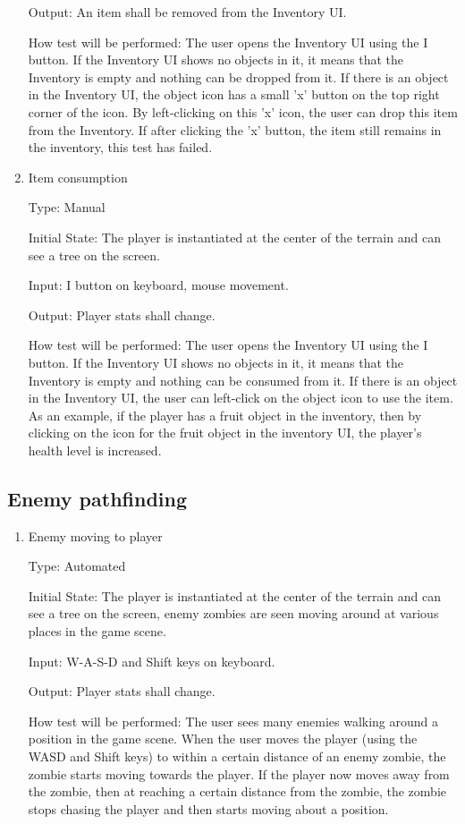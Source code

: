 \documentclass[12pt, titlepage]{article}
\begin{document}
\begin{enumerate}
Output: An item shall be removed from the Inventory UI.

How test will be performed:
The user opens the Inventory UI using the I button. If the Inventory UI shows no objects in it, it means that the Inventory is empty and nothing can be dropped from it. If there is an object in the Inventory UI, the object icon has a small 'x' button on the top right corner of the icon. By left-clicking on this 'x' icon, the user can drop this item from the Inventory. If after clicking the 'x' button, the item still remains in the inventory, this test has failed.

\item{Item consumption\\}

Type: Manual

Initial State: The player is instantiated at the center of the terrain and can see a tree on the screen.

Input: I button on keyboard, mouse movement.

Output: Player stats shall change.

How test will be performed:
The user opens the Inventory UI using the I button. If the Inventory UI shows no objects in it, it means that the Inventory is empty and nothing can be consumed from it. If there is an object in the Inventory UI, the user can left-click on the object icon to use the item. As an example, if the player has a fruit object in the inventory, then by clicking on the icon for the fruit object in the inventory UI, the player's health level is increased. 

\end{enumerate}

\subsection{Enemy pathfinding}

\begin{enumerate}
	\item {Enemy moving to player\\}

	Type: Automated
	
	Initial State: The player is instantiated at the center of the terrain and can see a tree on the screen, enemy zombies are seen moving around at various places in the game scene.
	
	Input: W-A-S-D and Shift keys on keyboard.
	
	Output: Player stats shall change.
	
	How test will be performed:
	The user sees many enemies walking around a position in the game scene. When the user moves the player (using the WASD and Shift keys) to within a certain distance of an enemy zombie, the zombie starts moving towards the player. If the player now moves away from the zombie, then at reaching a certain distance from the zombie, the zombie stops chasing the player and then starts moving about a position.
	
\end{enumerate}
	
\end{document}
